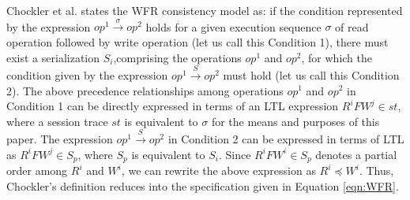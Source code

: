 \documentclass{sig-alternate-05-2015}
\begin{document}
   \par Chockler et al. states the WFR consistency model as: if the condition represented by the expression
  $\mathit{op}^1 \xrightarrow{\sigma} \mathit{op}^2$ holds for a given execution sequence $\sigma$ of read operation
  followed by write operation
  (let us call this Condition 1), there must exist a serialization ${S_i}$,comprising the
   operations $\mathit{op}^1$ and $\mathit{op}^2$, for which the condition given by the expression
  $\mathit{op}^1 \xrightarrow{S} \mathit{op}^2$ must hold (let us call this Condition 2).
  The above precedence relationships among operations $\mathit{op}^1$ and $\mathit{op}^2$ in Condition 1 can be directly
  expressed in terms of an LTL expression
    $R^i F W^j \in \mathit{st}$, where a session trace $\mathit{st}$ is equivalent to $\sigma$ for the
    means and purposes of this paper.
   The expression $\mathit{op}^1 \xrightarrow{S} \mathit{op}^2$ in Condition 2
  can be expressed in terms of LTL as $R^i F W^j \in S_p$,  where
  $S_p$ is equivalent to $S_i$. Since $R^i  F W^i  \in S_p$ denotes a partial order among $R^i$ and $W^i$, we can rewrite the above expression as  $R^i  \preccurlyeq W^i$. Thus, Chockler's definition reduces into the specification given in Equation \ref{eqn:WFR}. 
\end{document}
